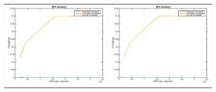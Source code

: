 \begin{figure}
\begin{tabular}{cc}
\includegraphics[scale=0.35]{../../src/fig-simulation_download_multimedia-bps-1_1_10_5_12000.eps} & \includegraphics[scale=0.35]{../../src/fig-simulation_download_multimedia-bps-1_1_25_10_12000.eps} \\


\end{tabular}
\end{figure}
